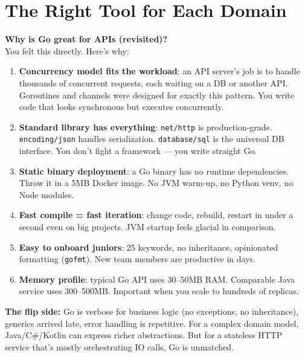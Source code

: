 \documentclass[11pt, letterpaper]{article}
\begin{document}
\section*{The Right Tool for Each Domain}

\begin{tcolorbox}[colback=partbg, colframe=sectionblue, arc=3pt, boxrule=1pt]
\textbf{Why is Go great for APIs (revisited)?}\\[4pt]
You felt this directly. Here's why:
\begin{enumerate}[noitemsep, leftmargin=*]
  \item \textbf{Concurrency model fits the workload}: an API server's job is to handle thousands of concurrent requests, each waiting on a DB or another API. Goroutines and channels were designed for exactly this pattern. You write code that looks synchronous but executes concurrently.
  \item \textbf{Standard library has everything}: \texttt{net/http} is production-grade. \texttt{encoding/json} handles serialization. \texttt{database/sql} is the universal DB interface. You don't fight a framework --- you write straight Go.
  \item \textbf{Static binary deployment}: a Go binary has no runtime dependencies. Throw it in a 5MB Docker image. No JVM warm-up, no Python venv, no Node modules.
  \item \textbf{Fast compile = fast iteration}: change code, rebuild, restart in under a second even on big projects. JVM startup feels glacial in comparison.
  \item \textbf{Easy to onboard juniors}: 25 keywords, no inheritance, opinionated formatting (\texttt{gofmt}). New team members are productive in days.
  \item \textbf{Memory profile}: typical Go API uses 30--50MB RAM. Comparable Java service uses 300--500MB. Important when you scale to hundreds of replicas.
\end{enumerate}
\textbf{The flip side:} Go is verbose for business logic (no exceptions, no inheritance), generics arrived late, error handling is repetitive. For a complex domain model, Java/C\#/Kotlin can express richer abstractions. But for a stateless HTTP service that's mostly orchestrating IO calls, Go is unmatched.
\end{tcolorbox}
\end{document}
